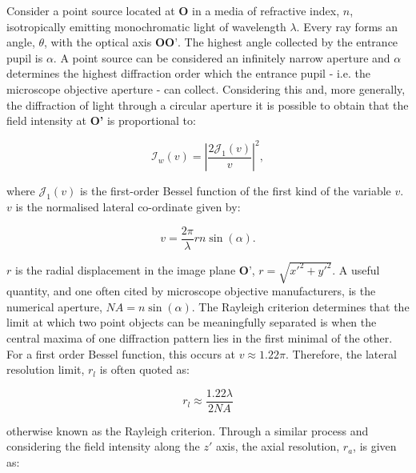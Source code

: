 Consider a point source located at $\textbf{O}$ in a media of refractive 
index, $n$, isotropically emitting monochromatic light of wavelength 
$\lambda$. Every ray forms an angle, $\theta$, with the optical axis 
$\textbf{OO'}$. The highest angle collected by the entrance pupil is 
$\alpha$. A point source can be considered an infinitely narrow aperture and 
$\alpha$ determines the highest diffraction order which the entrance pupil - 
i.e. the microscope objective aperture - can 
collect\cite{davidson2002optical}. Considering this and, more generally, the 
diffraction of light through a circular aperture it is possible to obtain 
that the field intensity at \textbf{O'} is proportional 
to\cite{goodman2005introduction,born2013principles}:

\begin{equation}\label{eq:image_field_insentity}
\mathcal{I}_{w}(v) = \left|\frac{2\mathcal{J}_{1}(v)}{v}\right|^2,
\end{equation}

where $\mathcal{J}_{1}(v)$ is the first-order Bessel function of the first 
kind of the variable $v$\cite{watson1995treatise}. $v$ is the normalised 
lateral co-ordinate given by\cite{wilson1984theory}:

\begin{equation}\label{eq:normalised_lateral}
v = \frac{2\pi}{\lambda}rn\sin(\alpha).
\end{equation}

$r$ is the radial displacement in the image plane $\textbf{O'}$, $r = \sqrt{x'^{2} + y'^{2}}$. 
A useful quantity, and one often cited by microscope objective manufacturers, 
is the numerical aperture, $NA = n\sin(\alpha)$. The Rayleigh criterion 
determines that the limit at which two point objects can be meaningfully 
separated is when the central maxima of one diffraction pattern lies in the
first minimal of the other\cite{rayleigh1874xii,rayleigh1880investigations}. For a first order Bessel 
function, this occurs at $v \approx 1.22\pi$. Therefore, the lateral resolution 
limit, $r_l$ is often quoted as:

\begin{equation}\label{eq:lateral_res}
r_l \approx \frac{1.22\lambda}{2NA}
\end{equation}

otherwise known as the Rayleigh criterion\cite{rayleigh1874xii}. Through
a similar process and considering the field intensity along the $z'$ axis, the
axial resolution, $r_a$, is given as\cite{pawley2006handbook}:

